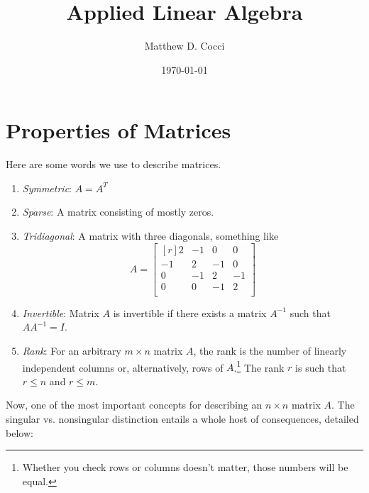 \documentclass[12pt]{article}
\author{Matthew D. Cocci}
\title{Applied Linear Algebra}
\date{\today}
\theoremstyle{plain}
\theoremstyle{definition}
\theoremstyle{remark}
\begin{document}
\maketitle


\newpage
\section{Properties of Matrices}

Here are some words we use to describe matrices.
\begin{enumerate}
\item \emph{Symmetric}: $A=A^T$
\item \emph{Sparse}: A matrix consisting of mostly zeros.
\item \emph{Tridiagonal}: A matrix with three diagonals, something like
\[
  A = 
  \begin{bmatrix}[r]
   2 & -1 &  0 &  0 \\ 
  -1 & 2 & -1 &  0 \\  
   0 & -1 &  2 & -1 \\ 
   0 &  0 & -1 &  2 \\   
  \end{bmatrix} 
\]
\item \emph{Invertible}: Matrix $A$ is invertible if there exists a matrix $A^{-1}$ such that $A A^{-1} = I$.

\item \emph{Rank}: For an arbitrary $m\times n$ matrix $A$, the rank is the number of linearly independent columns or, alternatively, rows of $A$.\footnote{Whether you check rows or columns doesn't matter, those numbers will be equal.} The rank $r$ is such that $r \leq n$ and $r\leq m$.
\end{enumerate}
Now, one of the most important concepts for describing an $n\times n$ matrix $A$. The singular vs. nonsingular distinction entails a whole host of consequences, detailed below:
\end{document}
